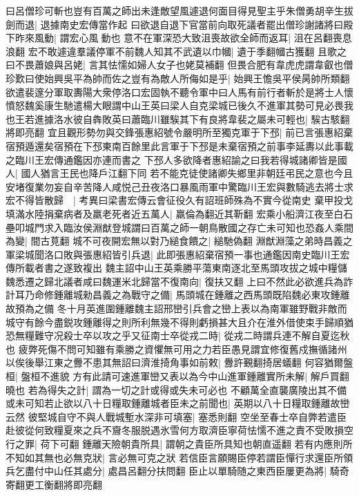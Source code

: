 曰呂僧珍可斬也豈有百萬之師出未逢敵望風遽退何面目得見聖主乎朱僧勇胡辛生拔劍而退|{
	退據南史宏傳當作起}
曰欲退自退下官當前向取死議者罷出僧珍謝諸將曰殿下昨來風動|{
	謂宏心風動也}
意不在軍深恐大致沮喪故欲全師而返耳|{
	沮在呂翻喪息浪翻}
宏不敢遽違羣議停軍不前魏人知其不武遺以巾幗|{
	遺于季翻幗古獲翻}
且歌之曰不畏蕭娘與呂姥|{
	言其怯懦如婦人女子也姥莫補翻}
但畏合肥有韋虎虎謂韋叡也僧珍歎曰使始興吳平為帥而佐之豈有為敵人所侮如是乎|{
	始興王憺吳平侯昺帥所類翻}
欲遣裴邃分軍取夀陽大衆停洛口宏固執不聽令軍中曰人馬有前行者斬於是將士人懷憤怒魏奚康生馳遣楊大眼謂中山王英曰梁人自克梁城已後久不進軍其勢可見必畏我也王若進據洛水彼自犇敗英曰蕭臨川雖騃其下有良將韋裴之屬未可輕也|{
	騃古駭翻將即亮翻}
宜且觀形勢勿與交鋒張惠紹號令嚴明所至獨克軍于下邳|{
	前已言張惠紹棄宿預遁還矣宿預在下邳東南百餘里此言軍于下邳是未棄宿預之前事李延夀以此事載之臨川王宏傳通鑑因亦連而書之}
下邳人多欲降者惠紹諭之曰我若得城諸卿皆是國人|{
	國人猶言王民也降戶江翻下同}
若不能克徒使諸卿失鄉里非朝廷弔民之意也今且安堵復業勿妄自辛苦降人咸悦己丑夜洛口暴風雨軍中驚臨川王宏與數騎逃去將士求宏不得皆散歸　|{
	考異曰梁書宏傳云會征役久有詔班師殊為不實今從南史}
棄甲投戈填滿水陸捐棄病者及羸老死者近五萬人|{
	羸倫為翻近其靳翻}
宏乘小船濟江夜至白石壘叩城門求入臨汝侯淵猷登城謂曰百萬之師一朝鳥散國之存亡未可知也恐姦人乘間為變|{
	間古莧翻}
城不可夜開宏無以對乃縋食饋之|{
	縋馳偽翻}
淵猷淵藻之弟時昌義之軍梁城聞洛口敗與張惠紹皆引兵退|{
	此即張惠紹棄宿預一事也通鑑因南史臨川王宏傳所載者書之遂致複出}
魏主詔中山王英乘勝平蕩東南逐北至馬頭攻拔之城中糧儲魏悉遷之歸北議者咸曰魏運米北歸當不復南向|{
	復扶又翻}
上曰不然此必欲進兵為詐計耳乃命修鍾離城勑昌義之為戰守之備|{
	馬頭城在鍾離之西馬頭既陷魏必東攻鍾離故預為之備}
冬十月英進圍鍾離魏主詔邢巒引兵會之巒上表以為南軍雖野戰非敵而城守有餘今盡鋭攻鍾離得之則所利無幾不得則虧損甚大且介在淮外借使束手歸順猶恐無糧難守况殺士卒以攻之乎又征南士卒從戎二時|{
	從戎二時謂兵連不解自夏迄秋也}
疲弊死傷不問可知雖有乘勝之資懼無可用之力若臣愚見謂宜修復舊戍撫循諸州以俟後舉江東之釁不患其無詔曰濟淮掎角事如前敕|{
	釁許覲翻掎居蟻翻}
何容猶爾盤桓|{
	盤桓不進貌}
方有此請可速進軍巒又表以為今中山進軍鍾離實所未解|{
	解戶買翻曉也}
若為得失之計|{
	謂為一切之計或得或失未可必也}
不顧萬全直襲廣陵出其不備或未可知若止欲以八十日糧取鍾離城者臣未之前聞也|{
	英期以八十日糧取鍾離故巒云然}
彼堅城自守不與人戰城塹水深非可填塞|{
	塞悉則翻}
空坐至春士卒自弊若遣臣赴彼從何致糧夏來之兵不齎冬服脱遇氷雪何方取濟臣寧荷怯懦不進之責不受敗損空行之罪|{
	荷下可翻}
鍾離天險朝貴所具|{
	謂朝之貴臣所具知也朝直遥翻}
若有内應則所不知如其無也必無克狀|{
	言必無可克之狀}
若信臣言願賜臣停若謂臣憚行求還臣所領兵乞盡付中山任其處分|{
	處昌呂翻分扶問翻}
臣止以單騎随之東西臣屢更為將|{
	騎奇寄翻更工衡翻將即亮翻}
